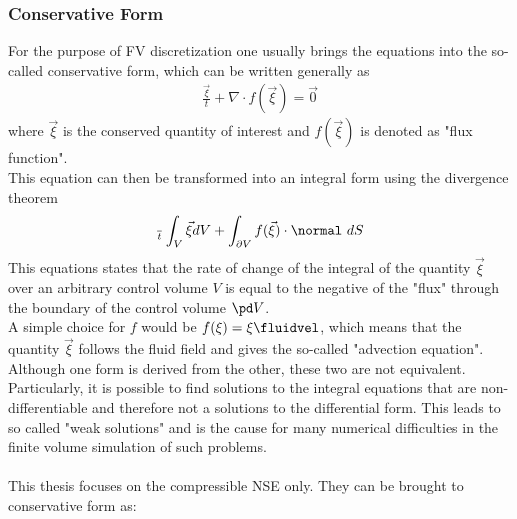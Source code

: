 \documentclass[../main.tex]{subfiles}
\begin{document}
\subsubsection{Conservative Form}\label{sec:conservative_form_nsg}
For the purpose of \ac{FV} discretization one usually brings the equations into the so-called conservative form, which can be written generally as
\begin{align}\label{eq:conservative_form_general}
\tfrac{\vec{\xi}}{t}+\nabla\cdot f(\vec{\xi}) = \vec{0}
\end{align}
where $\vec{\xi}$ is the conserved quantity of interest and $f(\vec{\xi})$ is denoted as "flux function".\\
This equation can then be transformed into an integral form using the divergence theorem
\begin{align}\label{eq:conservation_form_integral}
\tfrac{~}{t}\int_{V} \vec{\xi} dV + \int_{\partial V} f(\vec{\xi})\cdot\normal~dS
\end{align}
This equations states that the rate of change of the integral of the quantity $\vec{\xi}$ over an arbitrary control volume $V$ is equal to the negative of the "flux" through the boundary of the control volume $\pd V$.\\
A simple choice for $f$ would be $f(\xi)=\xi\fluidvel$, which means that the quantity $\vec{\xi}$ follows the fluid field and gives the so-called "advection equation".\\
Although one form is derived from the other, these two are not equivalent. Particularly, it is possible to find solutions to the integral equations that are non-differentiable and therefore not a solutions to the differential form. This leads to so called "weak solutions" and is the cause for many numerical difficulties in the finite volume simulation of such problems.
 \\
 \\
This thesis focuses on the compressible \ac{NSE} only. They can be brought to conservative form as:
\end{document}

